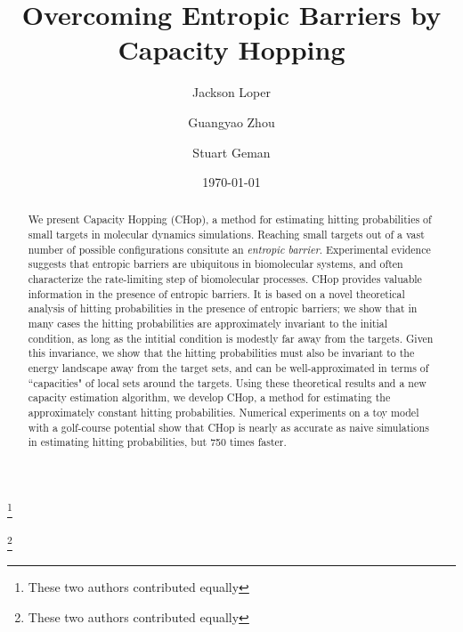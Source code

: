 \documentclass[english, aip, jcp, priprint, graphicx,floatfix]{revtex4-1}
\theoremstyle{plain}
\theoremstyle{definition}
\theoremstyle{plain}
\begin{document}
\title{Overcoming Entropic Barriers by Capacity Hopping} %

\author{Jackson Loper}
\thanks{These two authors contributed equally}

\author{Guangyao Zhou}
\thanks{These two authors contributed equally}

\author{Stuart Geman}

\date{\today}

\begin{abstract}
	We present Capacity Hopping (CHop), a method for estimating hitting probabilities of small targets in molecular dynamics simulations. Reaching small targets out of a vast number of possible configurations consitute an \emph{entropic barrier}. Experimental evidence suggests that entropic barriers are ubiquitous in biomolecular systems, and often characterize the rate-limiting step of biomolecular processes. CHop provides valuable information in the presence of entropic barriers. It is based on a novel theoretical analysis of hitting probabilities in the presence of entropic barriers; we show that in many cases the hitting probabilities are approximately invariant to the initial condition, as long as the intitial condition is modestly far away from the targets.  Given this invariance, we show that the hitting probabilities must also be invariant to the energy landscape away from the target sets, and can be well-approximated in terms of ``capacities" of local sets around the targets.  Using these theoretical results and a new capacity estimation algorithm, we develop CHop, a method for estimating the approximately constant hitting probabilities. Numerical experiments on a toy model with a golf-course potential show that CHop is nearly as accurate as naive simulations in estimating hitting probabilities, but 750 times faster.
\end{abstract}

\pacs{}%

\maketitle %
\end{document}
